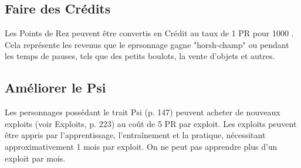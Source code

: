 \subsection{Faire des Crédits} \label{sec:making-credit} 

Les Points de Rez peuvent être convertis en Crédit au taux de 1 PR pour 1000 . Cela représente les revenus que le eprsonnage gagne "horsh-champ" ou pendant les temps de pauses, tels que des petits boulots, la vente d'objets et autres. 

\subsection{Améliorer le Psi} \label{sec:improving-psi} 

Les personnages possédant le trait Psi (p. 147) peuvent acheter de nouveaux exploits (voir Exploits, p. 223) au coût de 5 PR par exploit. Les exploits peuvent être appris par l'apprentissage, l'entraînement et la pratique, nécessitant approximativement 1 mois par exploit. On ne peut pas apprendre plus d'un exploit par mois. 
